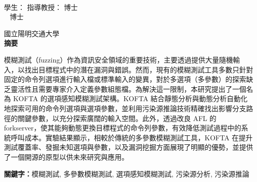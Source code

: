 \begin{center}
    \large
    \begin{singlespace}    
        \textbf{\chineseTitle{}} \\[0.5cm]
    \end{singlespace}

    \begin{singlespace}    
    學生：\studentCnName  \hspace{2.5cm}  指導教授：\advisorCnName \hspace{0.1cm} 博士 \\

    \ifdefined\advisorCnNameB %
        \hspace{9.6cm}  \advisorCnNameB ~ 博士 \\
    \fi
    \end{singlespace}

    \vspace{0.5cm}

    國立陽明交通大學\ \NameofDepartmentInstituteCN\ \iftoggle{iamphd}{博士班}{碩士班} \\[0.5cm]
    \textbf{摘\hspace{1cm}要} \\[0.5cm]

\end{center}

\normalsize 

模糊測試（fuzzing）作為資訊安全領域的重要技術，主要透過提供大量隨機輸入，以找出目標程式中的潛在漏洞與錯誤。然而，現有的模糊測試工具多數只針對固定的命令列選項進行輸入檔或標準輸入的變異，對於多選項（多參數）的探索缺乏靈活性且需要專家介入定義參數組態檔。為解決這一限制，本研究提出了一個名為 KOFTA 的選項感知模糊測試架構。KOFTA 結合靜態分析與動態分析自動化地探索可用的命令列選項與選項參數，並利用污染源推論技術精確找出影響分支路徑的關鍵參數，以充分探索廣闊的輸入空間。此外，透過改良 AFL 的 forkserver，使其能夠動態更換目標程式的命令列參數，有效降低測試過程中的系統呼叫成本。實驗結果顯示，相較於傳統的多參數模糊測試工具，KOFTA 在提升測試覆蓋率、發掘未知選項與參數，以及漏洞挖掘方面展現了明顯的優勢，並提供了一個開源的原型以供未來研究與應用。

\vspace{1cm}

\textbf{關鍵字：}模糊測試, 多參數模糊測試, 選項感知模糊測試, 污染源分析, 污染源推論
